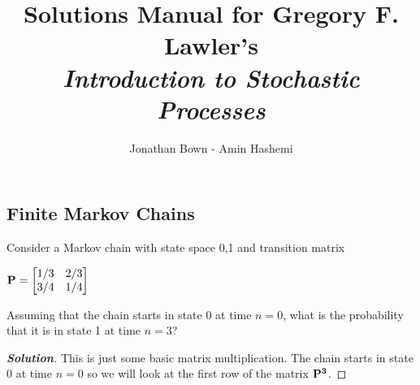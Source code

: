 \documentclass[12pt]{book}
\newenvironment{problem}[2][Problem]{\begin{trivlist}
\item[\hskip \labelsep {\bfseries #1}\hskip \labelsep {\bfseries #2.}]}{\end{trivlist}}
\newenvironment{solution}
               {\let\oldqedsymbol=\qedsymbol
                \renewcommand{\qedsymbol}{$\square$}
                \begin{proof}[\bfseries\upshape Solution]}
               {\end{proof}
                \renewcommand{\qedsymbol}{\oldqedsymbol}}
\begin{document}

\title{Solutions Manual for Gregory F. Lawler's \\ \emph{Introduction to Stochastic Processes}}%
\author{Jonathan Bown - Amin Hashemi}
\date{}

\maketitle

\part{}

\chapter{Finite Markov Chains}



\begin{problem}{1.1}
\end{problem}


\begin{problem}{1.2}
Consider a Markov chain with state space {0,1} and transition matrix\\
\begin{center}
$\bf{P} = \begin{bmatrix}
    1/3 & 2/3 \\
    3/4 & 1/4 
\end{bmatrix}$
\end{center}
Assuming that the chain starts in state $0$ at time $n = 0$, what is the probability that it is in state 1 at time $n=3$?
\end{problem}
\begin{solution}
This is just some basic matrix multiplication. The chain starts in state 0 at time $n = 0$ so we will look at the first row of the matrix $\bf{P}^3$. 
\end{solution}
\end{document}
